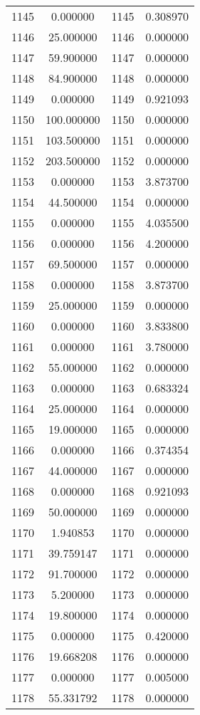\documentclass[12pt]{article}
\begin{document}
\begin{longtable}{@{}cccc@{}}
1145 & 0.000000 & 1145 & 0.308970 \\
1146 & 25.000000 & 1146 & 0.000000 \\
1147 & 59.900000 & 1147 & 0.000000 \\
1148 & 84.900000 & 1148 & 0.000000 \\
1149 & 0.000000 & 1149 & 0.921093 \\
1150 & 100.000000 & 1150 & 0.000000 \\
1151 & 103.500000 & 1151 & 0.000000 \\
1152 & 203.500000 & 1152 & 0.000000 \\
1153 & 0.000000 & 1153 & 3.873700 \\
1154 & 44.500000 & 1154 & 0.000000 \\
1155 & 0.000000 & 1155 & 4.035500 \\
1156 & 0.000000 & 1156 & 4.200000 \\
1157 & 69.500000 & 1157 & 0.000000 \\
1158 & 0.000000 & 1158 & 3.873700 \\
1159 & 25.000000 & 1159 & 0.000000 \\
1160 & 0.000000 & 1160 & 3.833800 \\
1161 & 0.000000 & 1161 & 3.780000 \\
1162 & 55.000000 & 1162 & 0.000000 \\
1163 & 0.000000 & 1163 & 0.683324 \\
1164 & 25.000000 & 1164 & 0.000000 \\
1165 & 19.000000 & 1165 & 0.000000 \\
1166 & 0.000000 & 1166 & 0.374354 \\
1167 & 44.000000 & 1167 & 0.000000 \\
1168 & 0.000000 & 1168 & 0.921093 \\
1169 & 50.000000 & 1169 & 0.000000 \\
1170 & 1.940853 & 1170 & 0.000000 \\
1171 & 39.759147 & 1171 & 0.000000 \\
1172 & 91.700000 & 1172 & 0.000000 \\
1173 & 5.200000 & 1173 & 0.000000 \\
1174 & 19.800000 & 1174 & 0.000000 \\
1175 & 0.000000 & 1175 & 0.420000 \\
1176 & 19.668208 & 1176 & 0.000000 \\
1177 & 0.000000 & 1177 & 0.005000 \\
1178 & 55.331792 & 1178 & 0.000000 \\

\end{longtable}
\end{document}
